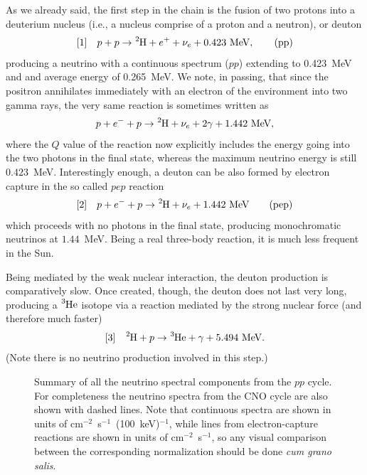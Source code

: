 As we already said, the first step in the chain is the fusion of two protons into
a deuterium nucleus (i.e., a nucleus comprise of a proton and a neutron), or deuton
\begin{align}
  \text{[1]} \quad p + p \rightarrow \ce{^2H} + e^+ + \nu_e + 0.423~\text{MeV},
  \tag{pp}
\end{align}
producing a neutrino with a continuous spectrum ($pp$) extending to 0.423~MeV and
and average energy of 0.265~MeV. We note, in passing, that since the positron
annihilates immediately with an electron of the environment into two gamma rays,
the very same reaction is sometimes written as
\begin{align*}
  p + e^- + p \rightarrow \ce{^2H} + \nu_e + 2\gamma + 1.442~\text{MeV},
\end{align*}
where the $Q$ value of the reaction now explicitly includes the energy going into
the two photons in the final state, whereas the maximum neutrino energy is still
$0.423$~MeV. Interestingly enough, a deuton can be also formed by electron
capture in the so called $pep$ reaction
\begin{align}
  \text{[2]} \quad  p + e^- + p \rightarrow \ce{^2H} + \nu_e + 1.442~\text{MeV}
  \tag{pep}
\end{align}
which proceeds with no photons in the final state, producing monochromatic neutrinos
at $1.44$~MeV. Being a real three-body reaction, it is much less frequent in the Sun.

Being mediated by the weak nuclear interaction, the deuton production is comparatively
slow. Once created, though, the deuton does not last very long, producing a $\ce{^3He}$
isotope via a reaction mediated by the strong nuclear force (and therefore much faster)
\begin{align*}
  \text{[3]} \quad \ce{^2H} + p \rightarrow \ce{^3He} + \gamma + 5.494~\text{MeV}.
\end{align*}
(Note there is no neutrino production involved in this step.)

\begin{figure}[!tbp]
  
  \caption{Summary of all the neutrino spectral components from the $pp$ cycle. For
  completeness the neutrino spectra from the CNO cycle are also shown with dashed
  lines. Note that continuous spectra are shown in units of cm$^{-2}$~s$^{-1}$~(100~keV)$^{-1}$,
  while lines from electron-capture reactions are shown in units of cm$^{-2}$~s$^{-1}$,
  so any visual comparison between the corresponding normalization should be done
  \emph{cum grano salis}.}
  \label{fig:sun_neutrino_spectra}
\end{figure}

